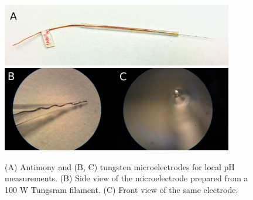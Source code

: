 \begin{figure}
\centering
\includegraphics[width=0.9\textwidth]{img/sb_top.jpg}
\includegraphics[width=0.45\textwidth]{img/wolfram_electrode1.jpg}\includegraphics[width=0.45\textwidth]{img/wolfram_electrode2.jpg}

\caption[Antimony and tungsten microelectrodes for local pH measurements.]{(A) Antimony and (B, C) tungsten microelectrodes for local pH measurements.
(B) Side view of the microelectrode prepared from a 100 W Tungsram filament.
(C) Front view of the same electrode.}
\label{fig:tungsten_electrode}
\end{figure}

